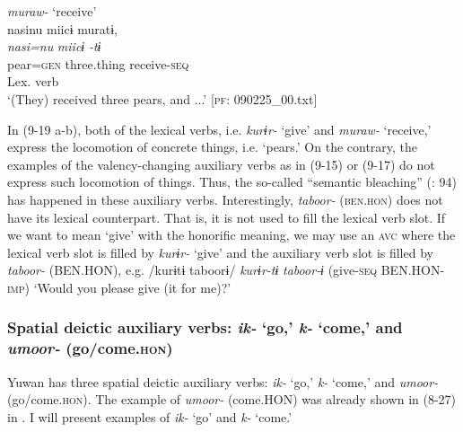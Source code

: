 \ex \textit{muraw-} ‘receive’\\
 \gllll  nasinu  miicɨ  muratɨ,\\
    \textit{nasi=nu}  \textit{miicɨ}  \textit{-tɨ}\\
    pear=\textsc{gen}  three.thing  receive-\textsc{seq}\\
     {} {}  {Lex. verb}\\
    \glt     ‘(They) received three pears, and ...’ [\textsc{pf}: 090225\_00.txt]
  \z
\z

In (9-19 a-b), both of the lexical verbs, i.e. \textit{kurɨr-} ‘give’ and \textit{muraw-} ‘receive,’ express the locomotion of concrete things, i.e. ‘pears.’ On the contrary, the examples of the valency-changing auxiliary verbs as in (9-15) or (9-17) do not express such locomotion of things. Thus, the so-called “semantic bleaching” (\citealt{HopperTraugott2003}: 94) has happened in these auxiliary verbs. Interestingly, \textit{taboor-} (\textsc{ben}.\textsc{hon}) does not have its lexical counterpart. That is, it is not used to fill the lexical verb slot. If we want to mean ‘give’ with the honorific meaning, we may use an \textsc{avc} where the lexical verb slot is filled by \textit{kurɨr-} ‘give’ and the auxiliary verb slot is filled by \textit{taboor-} (BEN.HON), e.g. /kurɨtɨ taboorɨ/ \textit{kurɨr-tɨ} \textit{taboor-ɨ} (give-\textsc{seq} BEN.HON-\textsc{imp}) ‘Would you please give (it for me)?’

\subsubsection{Spatial deictic auxiliary verbs: \textit{ik-} ‘go,’ \textit{k-} ‘come,’ and \textit{umoor-} (go/come.\textsc{hon})}\label{sec:9.1.1.4}

Yuwan has three spatial deictic auxiliary verbs: \textit{ik-} ‘go,’ \textit{k-} ‘come,’ and \textit{umoor-} (go/come.\textsc{hon}). The example of \textit{umoor-} (come.HON) was already shown in (8-27) in . I will present examples of \textit{ik-} ‘go’ and \textit{k-} ‘come.’

